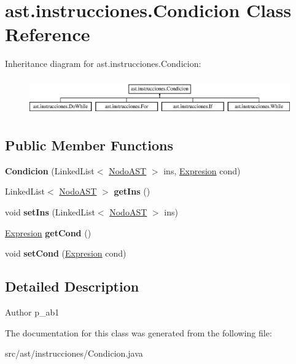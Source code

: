 \hypertarget{classast_1_1instrucciones_1_1_condicion}{}\section{ast.\+instrucciones.\+Condicion Class Reference}
\label{classast_1_1instrucciones_1_1_condicion}
Inheritance diagram for ast.\+instrucciones.\+Condicion\+:\begin{figure}[H]
\begin{center}
\leavevmode
\includegraphics[height=1.590909cm]{classast_1_1instrucciones_1_1_condicion}
\end{center}
\end{figure}
\subsection*{Public Member Functions}
\begin{DoxyCompactItemize}
\item 
\mbox{\label{classast_1_1instrucciones_1_1_condicion_a43fdc245eca24b92896e5360e8766115}} 
{\bfseries Condicion} (Linked\+List$<$ \mbox{\hyperlink{interfaceast_1_1_nodo_a_s_t}{Nodo\+A\+ST}} $>$ ins, \mbox{\hyperlink{interfaceast_1_1_expresion}{Expresion}} cond)
\item 
\mbox{\label{classast_1_1instrucciones_1_1_condicion_ab60c28ffc28109159254190967642ecd}} 
Linked\+List$<$ \mbox{\hyperlink{interfaceast_1_1_nodo_a_s_t}{Nodo\+A\+ST}} $>$ {\bfseries get\+Ins} ()
\item 
\mbox{\label{classast_1_1instrucciones_1_1_condicion_a47eb8d8b9b43773e1711b8d57c2623bc}} 
void {\bfseries set\+Ins} (Linked\+List$<$ \mbox{\hyperlink{interfaceast_1_1_nodo_a_s_t}{Nodo\+A\+ST}} $>$ ins)
\item 
\mbox{\label{classast_1_1instrucciones_1_1_condicion_a38aa1ed6dc8b60c6ac16b073ae64c87a}} 
\mbox{\hyperlink{interfaceast_1_1_expresion}{Expresion}} {\bfseries get\+Cond} ()
\item 
\mbox{\label{classast_1_1instrucciones_1_1_condicion_aafab95a5ec504c624f5d1854295a08ea}} 
void {\bfseries set\+Cond} (\mbox{\hyperlink{interfaceast_1_1_expresion}{Expresion}} cond)
\end{DoxyCompactItemize}


\subsection{Detailed Description}
\begin{DoxyAuthor}{Author}
p\+\_\+ab1 
\end{DoxyAuthor}


The documentation for this class was generated from the following file\+:\begin{DoxyCompactItemize}
\item 
src/ast/instrucciones/Condicion.\+java\end{DoxyCompactItemize}
